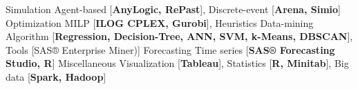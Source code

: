 


\begin{cvskills}
    \cvskill
    {Simulation}
    {Agent-based [\textbf{AnyLogic, RePast}], Discrete-event [\textbf{Arena, Simio}]}
    \cvskill
    {Optimization}
    {MILP [\textbf{ILOG CPLEX, Gurobi}], Heuristics}
    \cvskill
    {Data-mining}
    {Algorithm [\textbf{Regression, Decision-Tree, ANN, SVM, k-Means, DBSCAN}], Tools [{SAS® Enterprise Miner)}]}
	\cvskill
    {Forecasting}
    {Time series [\textbf{SAS® Forecasting Studio, R}]}
    \cvskill
    {Miscellaneous}
    {Visualization [\textbf{Tableau}], Statistics [\textbf{R, Minitab}], Big data [\textbf{Spark, Hadoop}]}    
  

\end{cvskills}



